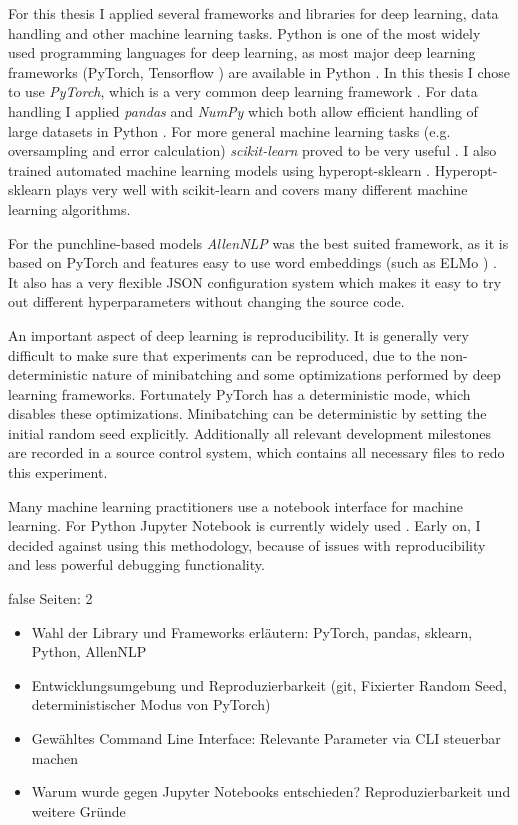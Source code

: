 \documentclass[draft,final,oneside]{vutinfth} %
\begin{document}
For this thesis I applied several frameworks and libraries for deep learning, data handling and other machine learning tasks. Python is one of the most widely used programming languages for deep learning, as most major deep learning frameworks (PyTorch, Tensorflow \cite{pytorch}\cite{tensorflow}) are available in Python \cite{python}. In this thesis I chose to use \textit{PyTorch}, which is a very common deep learning framework \cite{pytorch}. For data handling I applied \textit{pandas} and \textit{NumPy} which both allow efficient handling of large datasets in Python \cite{pandas}\cite{numpy}. For more general machine learning tasks (e.g. oversampling and error calculation) \textit{scikit-learn} proved to be very useful \cite{sklearn}. I also trained automated machine learning models using hyperopt-sklearn \cite{hyperoptpaper}. Hyperopt-sklearn plays very well with scikit-learn and covers many different machine learning algorithms.


For the punchline-based models \textit{AllenNLP} was the best suited framework, as it is based on PyTorch and features easy to use word embeddings (such as ELMo \cite{elmo}) \cite{allennlp}. It also has a very flexible JSON configuration system which makes it easy to try out different hyperparameters without changing the source code.

An important aspect of deep learning is reproducibility. It is generally very difficult to make sure that experiments can be reproduced, due to the non-deterministic nature of minibatching and some optimizations performed by deep learning frameworks. Fortunately PyTorch has a deterministic mode, which disables these optimizations. Minibatching can be deterministic by setting the initial random seed explicitly. Additionally all relevant development milestones are recorded in a source control system, which contains all necessary files to redo this experiment.

Many machine learning practitioners use a notebook interface for machine learning. For Python Jupyter Notebook is currently widely used \cite{jupyter}. Early on, I decided against using this methodology, because of issues with reproducibility and less powerful debugging functionality.

\if false
Seiten: 2

\begin{itemize}

\item Wahl der Library und Frameworks erläutern: PyTorch, pandas, sklearn, Python, AllenNLP
\item Entwicklungsumgebung und Reproduzierbarkeit (git, Fixierter Random Seed, deterministischer Modus von PyTorch)
\item Gewähltes Command Line Interface: Relevante Parameter via CLI steuerbar machen
\item Warum wurde gegen Jupyter Notebooks entschieden? Reproduzierbarkeit und weitere Gründe

\end{itemize}
\end{document}
